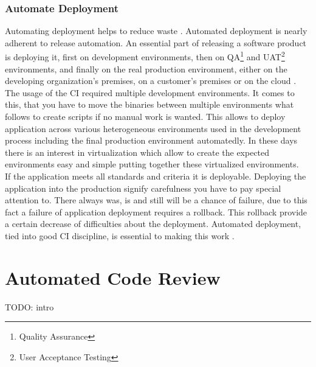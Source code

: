 \subsection{Automate Deployment}

Automating deployment helps to reduce waste \cite{CollabNet}. Automated deployment is nearly adherent to release automation. An essential part of releasing a software product is deploying it, first on development environments, then on QA\footnote{Quality Assurance} and UAT\footnote{User Acceptance Testing} environments, and finally on the real production environment, either on the developing organization's premises, on a customer's premises or on the cloud \cite{deployment_automation}. The usage of the CI required multiple development environments. It comes to this, that you have to move the binaries between multiple environments what follows to create scripts if no manual work is wanted. This allows to deploy application across various heterogeneous environments used in the development process including the final production environment automatedly. In these days there is an interest in virtualization which allow to create the expected environments easy and simple putting together these virtualized environments.\\

If the application meets all standards and criteria it is deployable. Deploying the application into the production signify carefulness you have to pay special attention to. There always was, is and still will be a chance of failure, due to this fact a failure of application deployment requires a rollback. This rollback provide a certain decrease of difficulties about the deployment. Automated deployment, tied into good CI discipline, is essential to making this work \cite{MartinFowler}.

\chapter{Automated Code Review}

{\color{red}TODO: intro}

